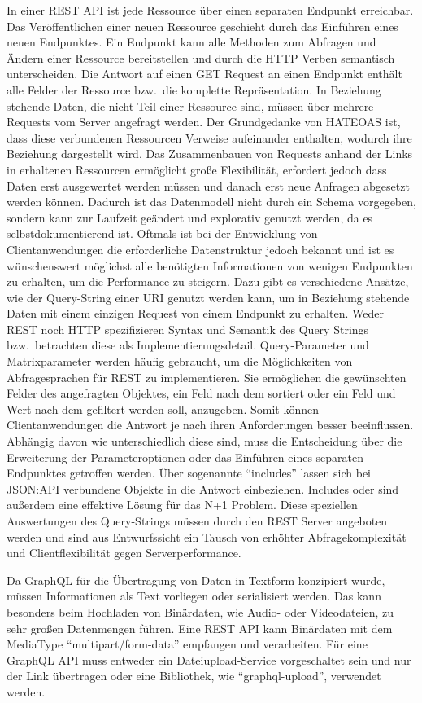 In einer REST API ist jede Ressource über einen separaten Endpunkt erreichbar.
Das Veröffentlichen einer neuen Ressource geschieht durch das Einführen eines neuen Endpunktes.
Ein Endpunkt kann alle Methoden zum Abfragen und Ändern einer Ressource bereitstellen und durch die HTTP Verben semantisch unterscheiden.
Die Antwort auf einen GET Request an einen Endpunkt enthält alle Felder der Ressource bzw.\ die komplette Repräsentation.
In Beziehung stehende Daten, die nicht Teil einer Ressource sind, müssen über mehrere Requests vom Server angefragt werden.
Der Grundgedanke von HATEOAS ist, dass diese verbundenen Ressourcen Verweise aufeinander enthalten, wodurch ihre Beziehung dargestellt wird.
Das Zusammenbauen von Requests anhand der Links in erhaltenen Ressourcen ermöglicht große Flexibilität, erfordert jedoch dass Daten erst ausgewertet werden müssen und danach erst neue Anfragen abgesetzt werden können.
Dadurch ist das Datenmodell nicht durch ein Schema vorgegeben, sondern kann zur Laufzeit geändert und explorativ genutzt werden, da es selbstdokumentierend ist.
Oftmals ist bei der Entwicklung von Clientanwendungen die erforderliche Datenstruktur jedoch bekannt und ist es wünschenswert möglichst alle benötigten Informationen von wenigen Endpunkten zu erhalten, um die Performance zu steigern.
Dazu gibt es verschiedene Ansätze, wie der Query-String einer URI genutzt werden kann, um in Beziehung stehende Daten mit einem einzigen Request von einem Endpunkt zu erhalten.
Weder REST noch HTTP spezifizieren Syntax und Semantik des Query Strings bzw.\ betrachten diese als Implementierungsdetail.
Query-Parameter und Matrixparameter werden häufig gebraucht, um die Möglichkeiten von Abfragesprachen für REST zu implementieren.
Sie ermöglichen \zB{} die gewünschten Felder des angefragten Objektes, ein Feld nach dem sortiert oder ein Feld und Wert nach dem gefiltert werden soll, anzugeben.
Somit können Clientanwendungen die Antwort je nach ihren Anforderungen besser beeinflussen.
Abhängig davon wie unterschiedlich diese sind, muss die Entscheidung über die Erweiterung der Parameteroptionen oder das Einführen eines separaten Endpunktes getroffen werden.
Über sogenannte \enquote{includes} lassen sich bei JSON:API verbundene Objekte in die Antwort einbeziehen.
Includes oder sind außerdem eine effektive Lösung für das N+1 Problem.
Diese speziellen Auswertungen des Query-Strings müssen durch den REST Server angeboten werden und sind aus Entwurfssicht ein Tausch von erhöhter Abfragekomplexität und Clientflexibilität gegen Serverperformance.
\par
Da GraphQL für die Übertragung von Daten in Textform konzipiert wurde, müssen Informationen als Text vorliegen oder serialisiert werden.
Das kann besonders beim Hochladen von Binärdaten, wie Audio- oder Videodateien, zu sehr großen Datenmengen führen.
Eine REST API kann Binärdaten mit dem MediaType \enquote{multipart/form-data} empfangen und verarbeiten.
Für eine GraphQL API muss entweder ein Dateiupload-Service vorgeschaltet sein und nur der Link übertragen oder eine Bibliothek, wie \enquote{graphql-upload}, verwendet werden.

